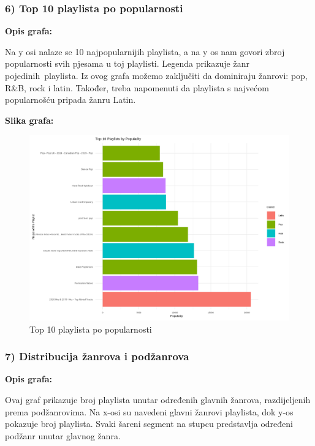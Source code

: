 	\subsubsection{6) Top 10 playlista po popularnosti}
	
	\textbf{Opis grafa:}
	
	Na y osi nalaze se 10 najpopularnijih playlista, a na y os nam govori zbroj popularnosti svih pjesama u toj playlisti. Legenda prikazuje žanr pojedinih playlista. 
	Iz ovog grafa možemo zaključiti da dominiraju žanrovi: pop, R&B, rock i latin. Također, treba napomenuti da playlista s najvećom popularnošću pripada žanru Latin.
	
	\textbf{Slika grafa:}
	\begin{figure}[H]
		\includegraphics[scale=0.9]{slike/playlists_by_popularity.png}
		\centering
		\caption{Top 10 playlista po popularnosti}
		
	\end{figure}
	
		\subsubsection{7) Distribucija žanrova i podžanrova}
	
	\textbf{Opis grafa:}
	
		Ovaj graf prikazuje broj playlista unutar određenih glavnih žanrova, razdijeljenih prema podžanrovima. Na x-osi su navedeni glavni žanrovi playlista, dok y-os pokazuje broj playlista. Svaki šareni segment na stupcu predstavlja određeni podžanr unutar glavnog žanra.
		
